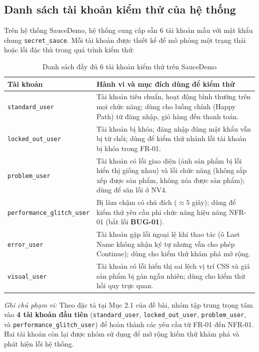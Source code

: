 \documentclass[a4paper]{article}
\begin{document}
\subsection{Danh sách tài khoản kiểm thử của hệ thống}
Trên hệ thống SauceDemo, hệ thống cung cấp sẵn 6 tài khoản mẫu với mật khẩu chung \texttt{secret\_sauce}. Mỗi tài khoản được thiết kế để mô phỏng một trạng thái hoặc lỗi đặc thù trong quá trình kiểm thử:
\begin{table}[H]
\centering
\small
\begin{tabularx}{\textwidth}{|l|X|}
\hline
\textbf{Tài khoản} & \textbf{Hành vi và mục đích dùng để kiểm thử} \\ \hline
\texttt{standard\_user} & Tài khoản tiêu chuẩn, hoạt động bình thường trên mọi chức năng; dùng cho luồng chính (Happy Path) từ đăng nhập, giỏ hàng đến thanh toán. \\ \hline
\texttt{locked\_out\_user} & Tài khoản bị khóa; đăng nhập đúng mật khẩu vẫn bị từ chối; dùng để kiểm thử nhánh lỗi tài khoản bị khóa trong FR-01. \\ \hline
\texttt{problem\_user} & Tài khoản có lỗi giao diện (ảnh sản phẩm bị lỗi hiển thị giống nhau) và lỗi chức năng (không sắp xếp được sản phẩm, không xóa được sản phẩm); dùng để săn lỗi ở NV4. \\ \hline
\texttt{performance\_glitch\_user} & Bị làm chậm có chủ đích ($\approx 5$ giây); dùng để kiểm thử yêu cầu phi chức năng hiệu năng NFR-01 (bắt lỗi \textbf{BUG-01}). \\ \hline
\texttt{error\_user} & Tài khoản gặp lỗi ngoại lệ khi thao tác (ô Last Name không nhận ký tự nhưng vẫn cho phép Continue); dùng cho kiểm thử khám phá mở rộng. \\ \hline
\texttt{visual\_user} & Tài khoản có lỗi hiển thị sai lệch vị trí CSS và giá sản phẩm bị gán ngẫu nhiên; dùng cho kiểm thử hồi quy trực quan. \\ \hline
\end{tabularx}
\caption{Danh sách đầy đủ 6 tài khoản kiểm thử trên SauceDemo}
\end{table}

\noindent \textit{Ghi chú phạm vi:} Theo đặc tả tại Mục 2.1 của đề bài, nhóm tập trung trọng tâm vào \textbf{4 tài khoản đầu tiên} (\texttt{standard\_user}, \texttt{locked\_out\_user}, \texttt{problem\_user}, và \texttt{performance\_glitch\_user}) để hoàn thành các yêu cầu từ FR-01 đến NFR-01. Hai tài khoản còn lại được nhóm sử dụng để mở rộng kiểm thử khám phá và phát hiện lỗi hệ thống.
\end{document}
